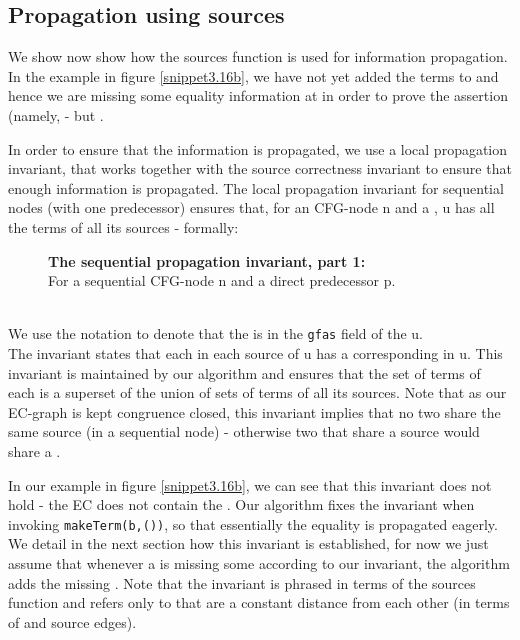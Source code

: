 \subsection{Propagation using sources}
We show now show how the sources function is used for information propagation.
In the example in figure \ref{snippet3.16b}, we have not yet added the terms  to  and hence we are missing some equality information at  in order to prove the assertion (namely,  - but .

In order to ensure that the information is propagated, we use a local propagation invariant, that works together with the source correctness invariant to ensure that enough information is propagated. 
The local propagation invariant for sequential nodes (with one predecessor) ensures that, for an CFG-node n and a \GT{} , u 
has all the terms of all its sources - formally:


\begin{figure}[H]
\textbf{The sequential propagation invariant, part 1:}\\
For a sequential CFG-node n and a direct predecessor p.\\
\\
\end{figure}

\noindent
We use the notation  to denote that the \GFA{}  is in the \lstinline|gfas| field of the \GT{} u.\\
The invariant states that each \GFA{} in each source of u has a corresponding \GFA{} in u.
This invariant is maintained by our algorithm and ensures that the set of terms of each \GT{} is a superset of the union of sets of terms of all its sources. 
Note that as our EC-graph is kept congruence closed, this invariant implies that no two \GTs{} share the same source (in a sequential node) - otherwise two \GTs{} that share a source would share a \GFA{}.

In our example in figure \ref{snippet3.16b}, we can see that this invariant does not hold - the EC  does not contain the \GFA{} . Our algorithm fixes the invariant when invoking \lstinline|makeTerm(b,())|, so that essentially the equality  is propagated eagerly. We detail in the next section how this invariant is established, for now we just assume that whenever a \GT{} is missing some \GFAs{} according to our invariant, the algorithm adds the missing \GFAs{}. Note that the invariant is phrased in terms of the sources function and refers only to \GTs{} that are a constant distance from each other (in terms of \GFA{} and source edges).


